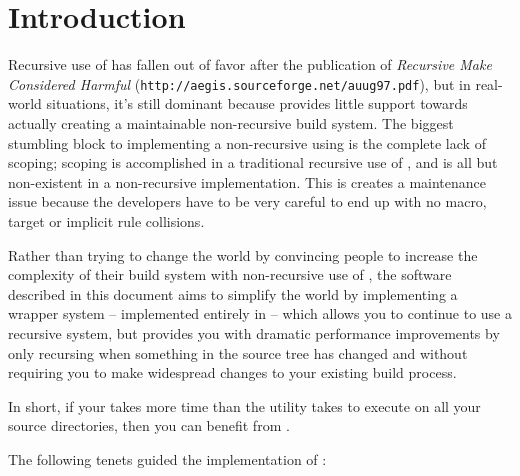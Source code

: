 %
%
%
%
\chapter{Introduction}

Recursive use of \make has fallen out of favor after the publication
of \emph{Recursive Make Considered Harmful}
(\texttt{http://aegis.sourceforge.net/auug97.pdf}), but in real-world
situations, it's still dominant because \make provides little support
towards actually creating a maintainable non-recursive build system.
The biggest stumbling block to implementing a non-recursive using
\make is the complete lack of scoping; scoping is accomplished in a
traditional recursive use of \make, and is all but non-existent in a
non-recursive implementation.  This is creates a maintenance issue
because the developers have to be very careful to end up with no macro,
target or implicit rule collisions.

Rather than trying to change the world by convincing people to
increase the complexity of their build system with non-recursive use
of \make, the software described in this document aims to simplify the
world by implementing a wrapper system -- implemented entirely in
\gnumake -- which allows you to continue to use a recursive \make
system, but provides you with dramatic performance improvements by
only recursing when something in the source tree has changed and
without requiring you to make widespread changes to your existing
build process.

In short, if your \nullbuild takes more time than the \mtree utility
takes to execute on all your source directories, then you can benefit
from \lmsbw.

The following tenets guided the implementation of \lmsbw:

